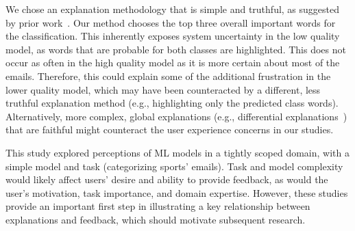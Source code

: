 We chose an explanation methodology that is simple and truthful, as suggested by prior work~\cite{Narayanan2018HowExplanation, Kulesza2013TooModels}. Our method chooses the top three overall important words for the classification. This inherently exposes system uncertainty in the low quality model, as words that are probable for both classes are highlighted. This does not occur as often in the high quality model as it is more certain about most of the emails. Therefore, this could explain some of the additional frustration in the lower quality model, which may have been counteracted by a different, less truthful explanation method (e.g., highlighting only the predicted class words). Alternatively, more complex, global explanations (e.g., differential explanations~\cite{Lakkaraju2019FaithfulModels}) that are faithful might counteract the user experience concerns in our studies. 

This study explored perceptions of ML models in a tightly scoped domain, with a simple model and task (categorizing sports' emails). Task and model complexity would likely affect users' desire and ability to provide feedback, as would the user's motivation, task importance, and domain expertise. However, these studies provide an important first step in illustrating a key relationship between explanations and feedback, which should motivate subsequent research.

